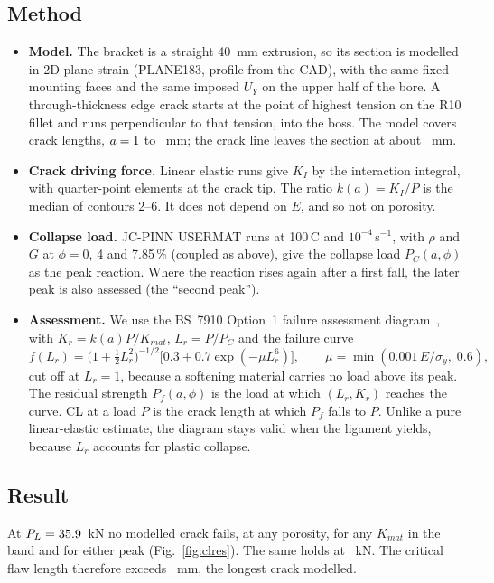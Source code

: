 \documentclass[11pt,a4paper]{article}
\begin{document}
\subsection{Method}
\begin{itemize}
\item \textbf{Model.} The bracket is a straight 40~mm extrusion, so its section is modelled in 2D plane strain (PLANE183, profile from the CAD), with the same fixed mounting faces and the same imposed $U_Y$ on the upper half of the bore. A through-thickness edge crack starts at the point of highest tension on the R10 fillet and runs perpendicular to that tension, into the boss. The model covers \nClCrackCount{} crack lengths, $a=1$ to \nClCrackMax~mm; the crack line leaves the section at about \nClCrackExit~mm.
\item \textbf{Crack driving force.} Linear elastic runs give $K_I$ by the interaction integral, with quarter-point elements at the crack tip. The ratio $k(a)=K_I/P$ is the median of contours 2--6. It does not depend on $E$, and so not on porosity.
\item \textbf{Collapse load.} JC-PINN USERMAT runs at 100\,\textdegree C and $10^{-4}$\,s$^{-1}$, with $\rho$ and $G$ at $\phi=0$, 4 and 7.85\,\% (coupled as above), give the collapse load $P_C(a,\phi)$ as the peak reaction. Where the reaction rises again after a first fall, the later peak is also assessed (the ``second peak'').
\item \textbf{Assessment.} We use the BS~7910 Option~1 failure assessment diagram~\cite{bs7910}, with $K_r=k(a)P/K_{mat}$, $L_r=P/P_C$ and the failure curve
\begin{equation}
f(L_r)=\bigl(1+\tfrac12L_r^2\bigr)^{-1/2}\bigl[0.3+0.7\exp(-\mu L_r^6)\bigr],\qquad \mu=\min(0.001\,E/\sigma_y,\;0.6),
\end{equation}
cut off at $L_r=1$, because a softening material carries no load above its peak. The residual strength $P_f(a,\phi)$ is the load at which $(L_r,K_r)$ reaches the curve. CL at a load $P$ is the crack length at which $P_f$ falls to $P$. Unlike a pure linear-elastic estimate, the diagram stays valid when the ligament yields, because $L_r$ accounts for plastic collapse.
\end{itemize}

\subsection{Result}
At $P_L=35.9$~kN no modelled crack fails, at any porosity, for any $K_{mat}$ in the band and for either peak (Fig.~\ref{fig:clres}). The same holds at \nClLimitFFkN~kN. The critical flaw length therefore exceeds \nClCrackMax~mm, the longest crack modelled.
\end{document}

